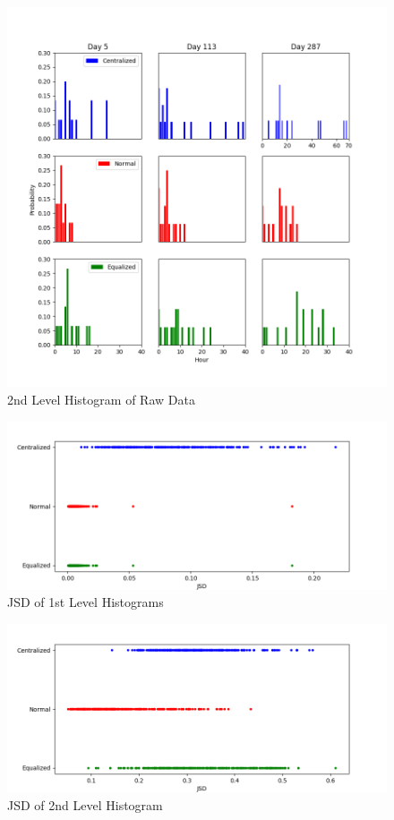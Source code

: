 \documentclass[a4paper]{IEEEtran}
\begin{document}
			\begin{figure}[!ht]
				\centering
				\includegraphics[width=\linewidth]{fig/Raw2ndLevelHist}
				\caption{2nd Level Histogram of Raw Data}
				\label{fig:raw-hist-2nd}
			\end{figure}
			
			\begin{figure}[!ht]
				\centering
				\includegraphics[width=\linewidth]{fig/RawOverview1st.png}
				\caption{JSD of 1st Level Histograms}
				\label{fig:raw-overview-1st}
			\end{figure}
			
			\begin{figure}[!ht]
				\centering
				\includegraphics[width=\linewidth]{fig/RawOverview2nd.png}
				\caption{JSD of 2nd Level Histogram}
				\label{fig:raw-overview-2nd}
			\end{figure}
			
\end{document}
